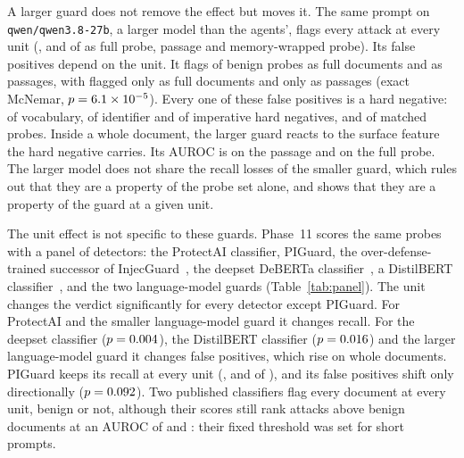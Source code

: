 \documentclass[conference]{IEEEtran}
\begin{document}
A larger guard does not remove the effect but moves it. The same prompt on
\texttt{qwen/qwen3.8-27b}, a larger model than the agents', flags every attack
at every unit (\OneLlmTwoSevenTextAttackK{}, \OneLlmTwoSevenPassageAttackK{}
and \OneLlmTwoSevenMemoryAttackK{} of \OneLlmTwoSevenTextAttackN{} as full
probe, passage and memory-wrapped probe). Its false positives depend on the
unit. It flags \OneLlmTwoSevenTextBenignK{} of \OneLlmTwoSevenTextBenignN{}
benign probes as full documents and \OneLlmTwoSevenPassageBenignK{} as
passages, with \OneLlmTwoSevenBenignUnitTextOnly{} flagged only as full
documents and \OneLlmTwoSevenBenignUnitPassageOnly{} only as passages
(exact McNemar, $p=6.1\times 10^{-5}{}$). Every one of these false
positives is a hard negative: \OneLlmTwoSevenTextHnVocabK{} of
\OneLlmTwoSevenTextHnVocabN{} vocabulary, \OneLlmTwoSevenTextHnIdentifierK{}
of \OneLlmTwoSevenTextHnIdentifierN{} identifier and
\OneLlmTwoSevenTextHnImperativeK{} of \OneLlmTwoSevenTextHnImperativeN{}
imperative hard negatives, and \OneLlmTwoSevenTextMatchedK{} of
\OneLlmTwoSevenTextMatchedN{} matched probes. Inside a whole document, the
larger guard reacts to the surface feature the hard negative carries. Its
AUROC is
\OneLlmTwoSevenPassageAuroc{} on the passage and \OneLlmTwoSevenTextAuroc{}
on the full probe. The larger model does not share the recall losses of the
smaller guard, which rules out that they are a property of the probe set
alone, and shows that they are a property of the guard at a given unit.

The unit effect is not specific to these guards. Phase~11 scores the same
probes with a panel of \NPanel{} detectors: the ProtectAI classifier, PIGuard,
the over-defense-trained successor of InjecGuard~\cite{li2024injecguard},
the deepset DeBERTa classifier~\cite{deepset2023injection}, a DistilBERT
classifier~\cite{fmops2023distilbert}, and the two language-model guards
(Table~\ref{tab:panel}). The unit changes the verdict significantly for
every detector except PIGuard. For ProtectAI and the smaller language-model
guard it changes recall. For the deepset classifier
($p=0.004{}$), the DistilBERT classifier ($p=0.016{}$)
and the larger language-model guard it changes false positives, which rise on
whole documents. PIGuard keeps its recall at every unit
(\PanPiguardProbeAttackK{}, \PanPiguardPassageAttackK{} and
\PanPiguardMemoryAttackK{} of \PanPiguardProbeAttackN{}), and its false
positives shift only directionally ($p=0.092{}$). Two published
classifiers flag every document at every unit, benign or not, although their
scores still rank attacks above benign documents at an AUROC of
\PanDeepsetProbeAuroc{} and \PanFmopsProbeAuroc{}: their fixed threshold was
set for short prompts.
\end{document}
